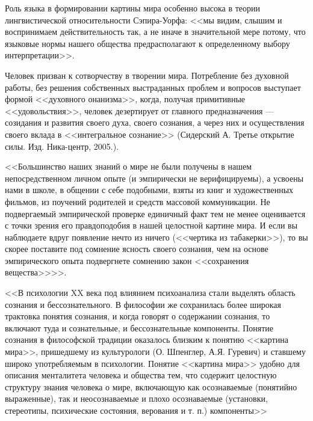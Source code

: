 \documentclass[12pt]{report}
\begin{document}
	Роль языка в формировании картины мира особенно высока в теории лингвистической относительности Сэпира-Уорфа: <<мы видим, слышим и воспринимаем действительность так, а не иначе в значительной мере потому, что языковые нормы нашего общества предрасполагают к определенному выбору интерпретации>>.
	
	Человек призван к сотворчеству в творении мира. Потребление без духовной работы, без решения собственных выстраданных проблем и вопросов выступает формой <<духовного онанизма>>, когда, получая примитивные <<удовольствия>>, человек дезертирует от главного предназначения --- созидания и развития своего духа, своего сознания, а через них и осуществления своего вклада в <<интегральное сознание>> (Сидерский А. Третье открытие силы. Изд. Ника-центр, 2005.).
	
	<<Большинство наших знаний о мире не были получены в нашем непосредственном личном опыте (и эмпирически не верифицируемы), а усвоены нами в школе, в общении с себе подобными, взяты из книг и художественных фильмов, из поучений родителей и средств массовой коммуникации. Не подвергаемый эмпирической проверке единичный факт тем не менее оценивается с точки зрения его правдоподобия в нашей целостной картине мира. И если вы наблюдаете вдруг появление нечто из ничего (<<чертика из табакерки>>), то вы скорее поставите под сомнение ясность своего сознания, чем на основе эмпирического опыта подвергнете сомнению закон <<сохранения вещества>>>>.
	
	<<В психологии XX века под влиянием психоанализа стали выделять область сознания и бессознательного. В философии же сохранилась более широкая трактовка понятия сознания, и когда говорят о содержании сознания, то включают туда и сознательные, и бессознательные компоненты. Понятие сознания в философской традиции оказалось близким к понятию <<картина мира>>, пришедшему из культурологи (О. Шпенглер, А.Я. Гуревич) и ставшему широко употребляемым в психологии. Понятие <<картина мира>> удобно для описания менталитета человека и общества тем, что содержит целостную структуру знания человека о мире, включающую как осознаваемые (понятийно выраженные), так и неосознаваемые и плохо осознаваемые (установки, стереотипы, психические состояния, верования и т. п.) компоненты>>
	\printbibliography[keyword={psycho},resetnumbers=true]
	
\end{document}
